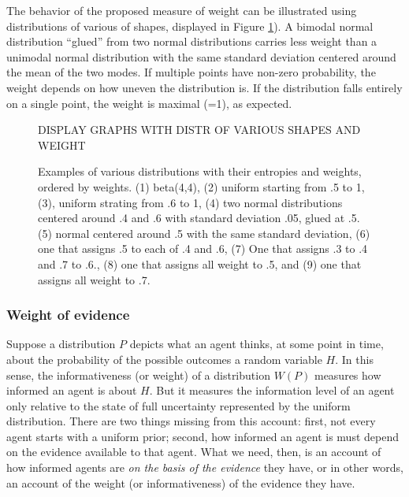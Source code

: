 \documentclass[
  10pt,
  dvipsnames,enabledeprecatedfontcommands]{scrartcl}
\begin{document}
The behavior of the proposed measure of weight can be illustrated using
distributions of various of shapes, displayed in Figure
\ref{fig:weightsWeird}). A bimodal normal distribution ``glued'' from
two normal distributions carries less weight than a unimodal normal
distribution with the same standard deviation centered around the mean
of the two modes. If multiple points have non-zero probability, the
weight depends on how uneven the distribution is. If the distribution
falls entirely on a single point, the weight is maximal (=1), as
expected.

\begin{figure}[H]

DISPLAY GRAPHS WITH DISTR OF VARIOUS SHAPES AND WEIGHT

\caption{Examples of various distributions with their entropies and weights, ordered by weights. (1) beta(4,4), (2) uniform starting from .5 to 1, (3), uniform strating from .6 to 1, (4) two normal distributions centered around .4 and .6 with standard deviation .05, glued at .5. (5) normal centered around .5 with the same standard deviation, (6) one that assigns .5 to each of .4  and .6, (7) One that assigns .3 to .4 and .7 to .6., (8) one that assigns all weight to .5, and (9) one that assigns all weight to .7.}

\label{fig:weightsWeird}
\end{figure}

\hypertarget{weight-of-evidence-1}{%
\subsubsection{Weight of evidence}\label{weight-of-evidence-1}}

Suppose a distribution \(P\) depicts what an agent thinks, at some point
in time, about the probability of the possible outcomes a random
variable \(H\). In this sense, the informativeness (or weight) of a
distribution \(W(P)\) measures how informed an agent is about \(H\). But
it measures the information level of an agent only relative to the state
of full uncertainty represented by the uniform distribution. There are
two things missing from this account: first, not every agent starts with
a uniform prior; second, how informed an agent is must depend on the
evidence available to that agent. What we need, then, is an account of
how informed agents are \textit{on the basis of the evidence} they have,
or in other words, an account of the weight (or informativeness) of the
evidence they have.
\end{document}
